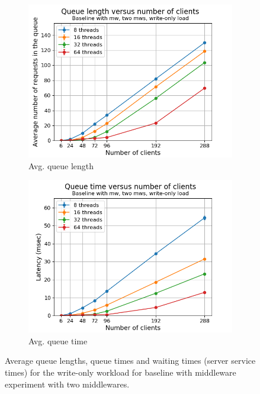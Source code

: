 \documentclass[11pt,a4paper]{article}
\begin{document}
\begin{figure}[h]
\centering
\begin{subfigure}{.5\textwidth}
  \centering
  \includegraphics[width=1.0\linewidth,trim={0px 0px 0px 0px},clip]{img/plot/mwb2-wo-qlen_mw.png}
  \caption{Avg. queue length}
  \label{fig:mwb2-wo-qlen_mw}
\end{subfigure}%
\begin{subfigure}{.5\textwidth}
  \centering
  \includegraphics[width=1.0\linewidth,trim={0px 0px 0px 0px},clip]{img/plot/mwb2-wo-qtime_mw.png}
  \caption{Avg. queue time}
  \label{fig:mwb2-wo-qtime_mw}
\end{subfigure}
\caption{Average queue lengths, queue times and waiting times (server service times) for the write-only workload for baseline with middleware experiment with two middlewares.}
\label{fig:mwb2-wo-qstats}
\end{figure}
\end{document}
